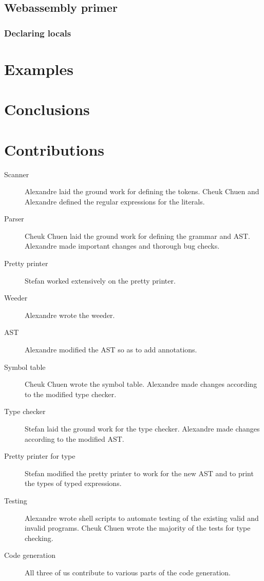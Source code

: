 \documentclass{article}
\begin{document}


\subsection{Webassembly primer}

\subsubsection{Declaring locals}

\section{Examples}

\section{Conclusions}

\section{Contributions}
\begin{description}
  \item [Scanner] Alexandre laid the ground work for defining the tokens. Cheuk Chuen and Alexandre defined the regular expressions for the literals.
  \item [Parser] Cheuk Chuen laid the ground work for defining the grammar and AST. Alexandre made important changes and thorough bug checks.
  \item [Pretty printer] Stefan worked extensively on the pretty printer.
  \item [Weeder] Alexandre wrote the weeder.
  \item [AST] Alexandre modified the AST so as to add annotations.
  \item [Symbol table] Cheuk Chuen wrote the symbol table. Alexandre made changes according to the modified type checker.
  \item [Type checker] Stefan laid the ground work for the type checker. Alexandre made changes according to the modified AST.
  \item [Pretty printer for type] Stefan modified the pretty printer to work for the new AST and to print the types of typed expressions.
  \item [Testing] Alexandre wrote shell scripts to automate testing of the existing valid and invalid programs. Cheuk Chuen wrote the majority of the tests for type checking.
  \item [Code generation] All three of us contribute to various parts of the code generation.
\end{description}
\end{document}
